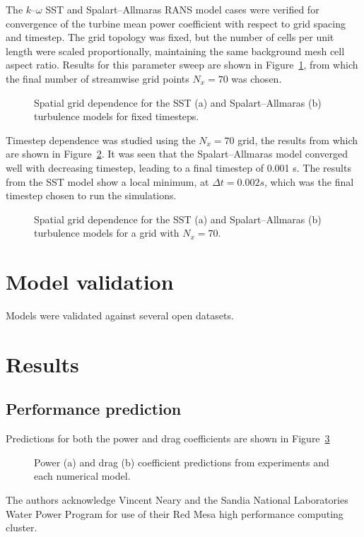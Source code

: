 \documentclass[aip,graphicx]{revtex4-1}
\begin{document}
The $k$--$\omega$ SST and Spalart--Allmaras RANS model cases were verified for
convergence of the turbine mean power coefficient with respect to grid spacing
and timestep. The grid topology was fixed, but the number of cells per unit
length were scaled proportionally, maintaining the same background mesh cell
aspect ratio. Results for this parameter sweep are shown in 
Figure~\ref{fig:spatial-grid-dep}, from which the final number of streamwise
grid points $N_x = 70$ was chosen.

\begin{figure}[ht]
\caption{Spatial grid dependence for the SST (a) and Spalart--Allmaras (b) 
turbulence models for fixed timesteps.}
\label{fig:spatial-grid-dep}
\end{figure}

Timestep dependence was studied using the $N_x=70$ grid, the results from which
are shown in Figure~\ref{fig:timestep-dep}. It was seen that the
Spalart--Allmaras model converged well with decreasing timestep, leading to a
final timestep of 0.001 s. The results from the SST model show a local minimum,
at $\Delta t = 0.002 s$, which was the final timestep chosen to run the
simulations.

\begin{figure}[ht]
\caption{Spatial grid dependence for the SST (a) and Spalart--Allmaras (b) 
turbulence models for a grid with $N_x=70$.}
\label{fig:timestep-dep}
\end{figure}

\section{Model validation}

Models were validated against several open datasets.


\section{Results}

\subsection{Performance prediction}

Predictions for both the power and drag coefficients are shown in Figure~\ref{fig:perf-comp}

\begin{figure}[ht]
\caption{Power (a) and drag (b) coefficient predictions from experiments and
each numerical model.}
\label{fig:perf-comp}
\end{figure}






\begin{acknowledgments}
The authors acknowledge Vincent Neary and the Sandia National Laboratories Water
Power Program for use of their Red Mesa high performance computing cluster.
\end{acknowledgments}


\end{document}
